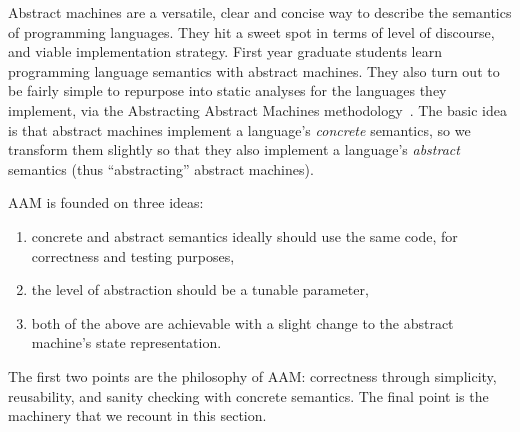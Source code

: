 Abstract machines are a versatile, clear and concise way to describe the semantics of programming languages.
%
They hit a sweet spot in terms of level of discourse, and viable implementation strategy.
%
First year graduate students learn programming language semantics with abstract machines.
%
They also turn out to be fairly simple to repurpose into static analyses for the languages they implement, via the Abstracting Abstract Machines methodology~\citep{dvanhorn:VanHorn2010Abstracting}.
%
The basic idea is that abstract machines implement a language's \emph{concrete} semantics, so we transform them slightly so that they also implement a language's \emph{abstract} semantics (thus ``abstracting'' abstract machines).

AAM is founded on three ideas:
\begin{enumerate}
\item{concrete and abstract semantics ideally should use the same code, for correctness and testing purposes,}
\item{the level of abstraction should be a tunable parameter,}
\item{both of the above are achievable with a slight change to the abstract machine's state representation.}
\end{enumerate}

The first two points are the philosophy of AAM: correctness through simplicity, reusability, and sanity checking with concrete semantics.
%
The final point is the machinery that we recount in this section.

